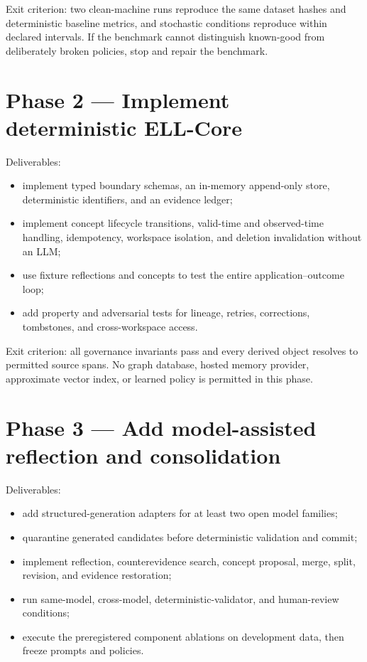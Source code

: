 \documentclass[
  english,
  a4paper,
  DIV=11,
  numbers=noendperiod]{scrreprt}
\providecommand{\tightlist}{%
  \setlength{\itemsep}{0pt}\setlength{\parskip}{0pt}}
\begin{document}
Exit criterion: two clean-machine runs reproduce the same dataset hashes
and deterministic baseline metrics, and stochastic conditions reproduce
within declared intervals. If the benchmark cannot distinguish
known-good from deliberately broken policies, stop and repair the
benchmark.

\section{Phase 2 --- Implement deterministic
ELL-Core}\label{phase-2-implement-deterministic-ell-core}

Deliverables:

\begin{itemize}
\tightlist
\item
  implement typed boundary schemas, an in-memory append-only store,
  deterministic identifiers, and an evidence ledger;
\item
  implement concept lifecycle transitions, valid-time and observed-time
  handling, idempotency, workspace isolation, and deletion invalidation
  without an LLM;
\item
  use fixture reflections and concepts to test the entire
  application--outcome loop;
\item
  add property and adversarial tests for lineage, retries, corrections,
  tombstones, and cross-workspace access.
\end{itemize}

Exit criterion: all governance invariants pass and every derived object
resolves to permitted source spans. No graph database, hosted memory
provider, approximate vector index, or learned policy is permitted in
this phase.

\section{Phase 3 --- Add model-assisted reflection and
consolidation}\label{phase-3-add-model-assisted-reflection-and-consolidation}

Deliverables:

\begin{itemize}
\tightlist
\item
  add structured-generation adapters for at least two open model
  families;
\item
  quarantine generated candidates before deterministic validation and
  commit;
\item
  implement reflection, counterevidence search, concept proposal, merge,
  split, revision, and evidence restoration;
\item
  run same-model, cross-model, deterministic-validator, and human-review
  conditions;
\item
  execute the preregistered component ablations on development data,
  then freeze prompts and policies.
\end{itemize}
\end{document}
